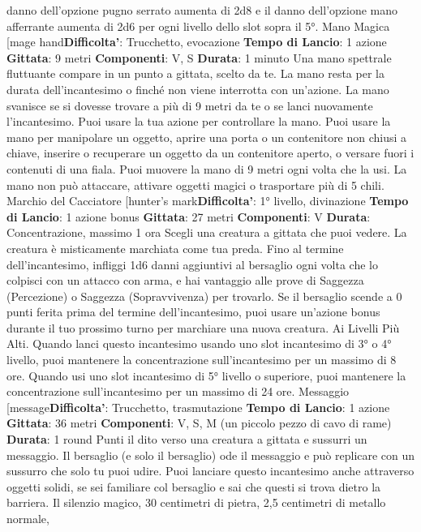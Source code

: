 \begin{multicols}{2}
danno dell’opzione pugno serrato aumenta di 2d8 e il
danno dell’opzione mano afferrante aumenta di 2d6 per
ogni livello dello slot sopra il 5°.
Mano Magica
[mage hand\textbf{Difficolta'}:
Trucchetto, evocazione
\textbf{Tempo di Lancio}: 1 azione
\textbf{Gittata}: 9 metri
\textbf{Componenti}: V, S
\textbf{Durata}: 1 minuto
Una mano spettrale fluttuante compare in un punto a
gittata, scelto da te. La mano resta per la durata
dell’incantesimo o finché non viene interrotta con
un’azione. La mano svanisce se si dovesse trovare a
più di 9 metri da te o se lanci nuovamente
l’incantesimo.
Puoi usare la tua azione per controllare la mano. Puoi
usare la mano per manipolare un oggetto, aprire una
porta o un contenitore non chiusi a chiave, inserire o
recuperare un oggetto da un contenitore aperto, o
versare fuori i contenuti di una fiala. Puoi muovere la
mano di 9 metri ogni volta che la usi.
La mano non può attaccare, attivare oggetti magici o
trasportare più di 5 chili.
Marchio del Cacciatore
[hunter’s mark\textbf{Difficolta'}:
1° livello, divinazione
\textbf{Tempo di Lancio}: 1 azione bonus
\textbf{Gittata}: 27 metri
\textbf{Componenti}: V
\textbf{Durata}: Concentrazione, massimo 1 ora
Scegli una creatura a gittata che puoi vedere. La
creatura è misticamente marchiata come tua preda.
Fino al termine dell’incantesimo, infliggi 1d6 danni
aggiuntivi al bersaglio ogni volta che lo colpisci con un
attacco con arma, e hai vantaggio alle prove di
Saggezza (Percezione) o Saggezza (Sopravvivenza)
per trovarlo. Se il bersaglio scende a 0 punti ferita prima
del termine dell’incantesimo, puoi usare un’azione
bonus durante il tuo prossimo turno per marchiare una
nuova creatura.
Ai Livelli Più Alti. Quando lanci questo incantesimo
usando uno slot incantesimo di 3° o 4° livello, puoi
mantenere la concentrazione sull’incantesimo per un
massimo di 8 ore. Quando usi uno slot incantesimo di
5° livello o superiore, puoi mantenere la concentrazione
sull’incantesimo per un massimo di 24 ore.
Messaggio
[message\textbf{Difficolta'}:
Trucchetto, trasmutazione
\textbf{Tempo di Lancio}: 1 azione
\textbf{Gittata}: 36 metri
\textbf{Componenti}: V, S, M (un piccolo pezzo di cavo di
rame)
\textbf{Durata}: 1 round
Punti il dito verso una creatura a gittata e sussurri un
messaggio. Il bersaglio (e solo il bersaglio) ode il
messaggio e può replicare con un sussurro che solo tu
puoi udire.
Puoi lanciare questo incantesimo anche attraverso
oggetti solidi, se sei familiare col bersaglio e sai che
questi si trova dietro la barriera. Il silenzio magico, 30
centimetri di pietra, 2,5 centimetri di metallo normale,

\end{multicols}
